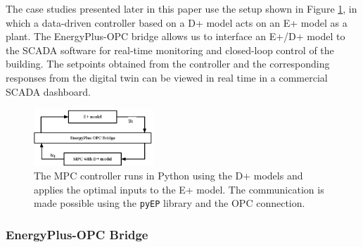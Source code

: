 
The case studies presented later in this paper use the setup shown in Figure \ref{F:control}, in which a data-driven controller based on a D+ model acts on an E+ model as a plant.
The EnergyPlus-OPC bridge allows us to interface an E+/D+ model to the SCADA software for real-time monitoring and closed-loop control of the building.
The setpoints obtained from the controller and the corresponding responses from the digital twin can be viewed in real time in a commercial SCADA dashboard.

\begin{figure}[t]
	\centering
	\includegraphics[width=0.4\textwidth]{images/control.eps}
	\caption{The MPC controller runs in Python using the D+ models and applies the optimal inputs to the E+ model. The communication is made possible using the \texttt{pyEP} library and the OPC connection.}
	\label{F:control}
\end{figure}

\subsubsection{EnergyPlus-OPC Bridge}

